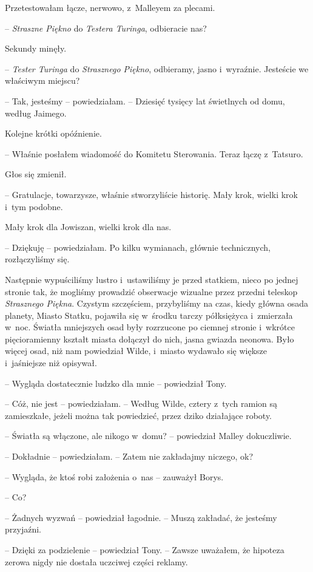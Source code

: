 \documentclass[oneside,polish,11pt,sfheadings]{mwbk}
\begin{document}
Przetestowałam łącze, nerwowo, z~Malleyem za plecami.

-- \textit{Straszne Piękno} do \textit{Testera Turinga}, odbieracie nas?

Sekundy minęły.

-- \textit{Tester Turinga} do \textit{Strasznego Piękno}, odbieramy, jasno i~wyraźnie. Jesteście we właściwym miejscu?

-- Tak, jesteśmy -- powiedziałam. -- Dziesięć tysięcy lat świetlnych od
domu, według Jaimego.

Kolejne krótki opóźnienie.

-- Właśnie posłałem wiadomość do Komitetu Sterowania. Teraz łączę z~Tatsuro.

Głos się zmienił. 

-- Gratulacje, towarzysze, właśnie stworzyliście
historię. Mały krok, wielki krok i~tym podobne.

Mały krok dla Jowiszan, wielki krok dla nas.

-- Dziękuję -- powiedziałam. Po kilku wymianach, głównie technicznych,
rozłączyliśmy się.

Następnie wypuściliśmy lustro i~ustawiliśmy je przed statkiem, nieco po
jednej stronie tak, że mogliśmy prowadzić obserwacje wizualne przez
przedni teleskop \textit{Strasznego Piękna}. Czystym szczęściem,
przybyliśmy na czas, kiedy główna osada planety, Miasto Statku, pojawiła
się w~środku tarczy półksiężyca i~zmierzała w~noc. Światła mniejszych
osad były rozrzucone po ciemnej stronie i~wkrótce pięcioramienny kształt
miasta dołączył do nich, jasna gwiazda neonowa. Było więcej osad, niż
nam powiedział Wilde, i~miasto wydawało się większe i~jaśniejsze niż
opisywał.

-- Wygląda dostatecznie ludzko dla mnie -- powiedział Tony.

-- Cóż, nie jest -- powiedziałam. -- Według Wilde, cztery z~tych ramion są
zamieszkałe, jeżeli można tak powiedzieć, przez dziko działające roboty.

-- Światła są włączone, ale nikogo w~domu? -- powiedział Malley
dokuczliwie.

-- Dokładnie -- powiedziałam. -- Zatem nie zakładajmy niczego, ok?

-- Wygląda, że ktoś robi założenia o~nas -- zauważył Borys.

-- Co?

-- Żadnych wyzwań -- powiedział łagodnie. -- Muszą zakładać, że jesteśmy
przyjaźni.

-- Dzięki za podzielenie -- powiedział Tony. -- Zawsze uważałem, że
hipoteza zerowa nigdy nie dostała uczciwej części reklamy.
\end{document}

